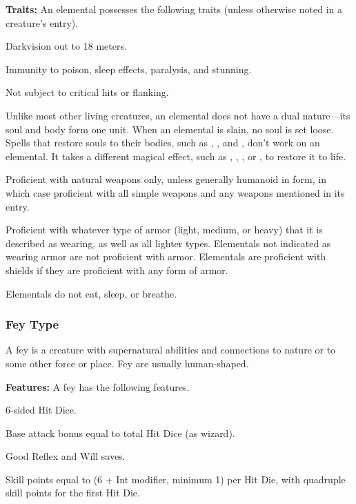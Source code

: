 \textbf{Traits:} An elemental possesses the following traits (unless otherwise noted in a creature's entry).
\begin{itemize*}
\item Darkvision out to 18 meters.
\item Immunity to poison, sleep effects, paralysis, and stunning.
\item Not subject to critical hits or flanking.
\item Unlike most other living creatures, an elemental does not have a dual nature---its soul and body form one unit. When an elemental is slain, no soul is set loose. Spells that restore souls to their bodies, such as , , and , don't work on an elemental. It takes a different magical effect, such as , , , or , to restore it to life.
\item Proficient with natural weapons only, unless generally humanoid in form, in which case proficient with all simple weapons and any weapons mentioned in its entry.
\item Proficient with whatever type of armor (light, medium, or heavy) that it is described as wearing, as well as all lighter types. Elementals not indicated as wearing armor are not proficient with armor. Elementals are proficient with shields if they are proficient with any form of armor.
\item Elementals do not eat, sleep, or breathe.
\end{itemize*}

\subsubsection{Fey Type}
A fey is a creature with supernatural abilities and connections to nature or to some other force or place. Fey are usually human-shaped.

\textbf{Features:} A fey has the following features.
\begin{itemize*}
\item 6-sided Hit Dice.
\item Base attack bonus equal to \onehalf total Hit Dice (as wizard).
\item Good Reflex and Will saves.
\item Skill points equal to (6 + Int modifier, minimum 1) per Hit Die, with quadruple skill points for the first Hit Die.
\end{itemize*}


